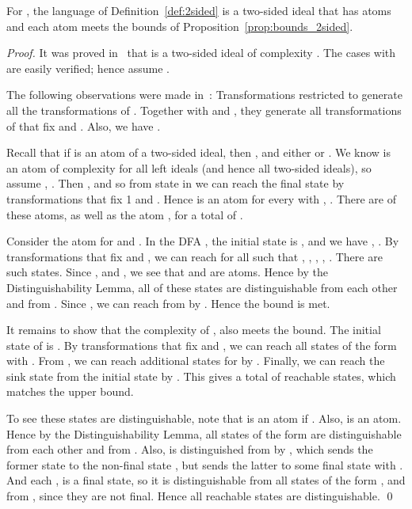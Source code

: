 \documentclass{llncs}
\newcommand{\distlemma}{the Distinguishability Lemma}
\begin{document}
\begin{theorem}
For , the language  of Definition~\ref{def:2sided} is a two-sided ideal that has  atoms and each atom meets the bounds of Proposition~\ref{prop:bounds_2sided}.
\end{theorem}
\begin{proof}

It was proved in~\cite{BrYe11} that  is a two-sided ideal of complexity .
The cases with   are easily verified; hence assume .

The following observations were made in~\cite{BrSz14}:  
Transformations  restricted to  generate all the transformations of . Together with  and , they generate all transformations of  that fix  and .
Also, we have .


Recall that if  is an atom of a two-sided ideal, then , and either  or .
We know  is an atom of complexity  for all left ideals (and hence all two-sided ideals), so assume , .
Then ,  and so from state  in  we can reach the final state  by transformations that fix 1 and .
Hence  is an atom for every  with , . There are  of these atoms, as well as the atom , for a total of .

Consider the atom  for  and . 
In the DFA , the initial state is , and we have , .
By transformations that fix  and , we can reach  for all  such that , , , , .
There are  such states.
Since ,  and ,  we see that  and  are atoms. Hence by \distlemma, all of these states are distinguishable from each other and from .
Since , we can reach  from  by . Hence  the  bound is met.

It remains to show that the complexity of ,  also meets the bound.
The initial state of  is . By transformations that fix  and , we can reach all  states of the form  with . From , we can reach  additional states  for  by .
Finally, we can reach the sink state  from the initial state by . This gives a total of  reachable states, which matches the upper bound.

To see these states are distinguishable, note that  is an atom if . Also,  is an atom. Hence by \distlemma, all states of the form  are distinguishable from each other and from .
Also,  is distinguished from  by , which sends the former state to the non-final state , but sends the latter to some final state  with . And each ,  is a final state, so it is distinguishable from all states of the form ,  and from , since they are not final.
Hence all  reachable states are distinguishable.
\qed
\end{proof}
\end{document}
